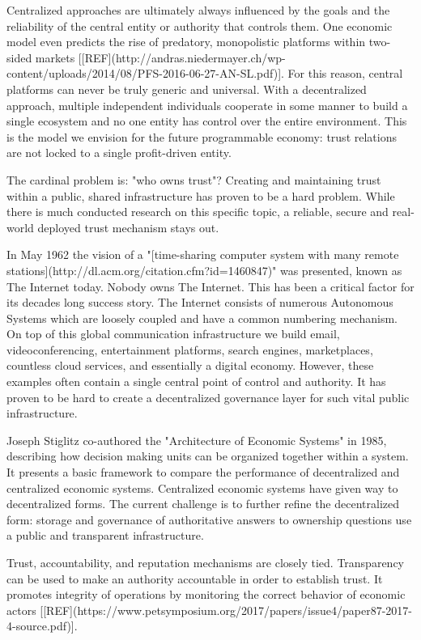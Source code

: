 \documentclass[USenglish]{article}
\begin{document}
Centralized approaches are ultimately always influenced by the goals and the reliability of the central entity or authority that controls them. 
One economic model even predicts the rise of predatory, monopolistic platforms within two-sided markets [[REF](http://andras.niedermayer.ch/wp-content/uploads/2014/08/PFS-2016-06-27-AN-SL.pdf)].
For this reason, central platforms can never be truly generic and universal. 
With a decentralized approach, multiple independent individuals cooperate in some manner to build a single ecosystem and no one entity has control over the entire environment.
This is the model we envision for the future programmable economy: trust relations are not locked to a single profit-driven entity.

The cardinal problem is: "who owns trust"?
Creating and maintaining trust within a public, shared infrastructure has proven to be a hard problem.
While there is much conducted research on this specific topic, a reliable, secure and real-world deployed trust mechanism stays out.

In May 1962 the vision of a "[time-sharing computer system with many remote stations](http://dl.acm.org/citation.cfm?id=1460847)" was presented, known as The Internet today.
Nobody owns The Internet.
This has been a critical factor for its decades long success story.
The Internet consists of numerous Autonomous Systems which are loosely coupled and have a common numbering mechanism.
On top of this global communication infrastructure we build email, videoconferencing, entertainment platforms, search engines, marketplaces, countless cloud services, and essentially a digital economy.
However, these examples often contain a single central point of control and authority.
It has proven to be hard to create a decentralized governance layer for such vital public infrastructure.

Joseph Stiglitz co-authored the "Architecture of Economic Systems" in 1985, describing how decision making units can be organized together within a system.
It presents a basic framework to compare the performance of decentralized and centralized economic systems.
Centralized economic systems have given way to decentralized forms.
The current challenge is to further refine the decentralized form: storage and governance of authoritative answers to ownership questions use a public and transparent infrastructure.

Trust, accountability, and reputation mechanisms are closely tied.
Transparency can be used to make an authority accountable in order to establish trust. 
It promotes integrity of operations by monitoring the correct behavior of economic actors [[REF](https://www.petsymposium.org/2017/papers/issue4/paper87-2017-4-source.pdf)].
\end{document}
